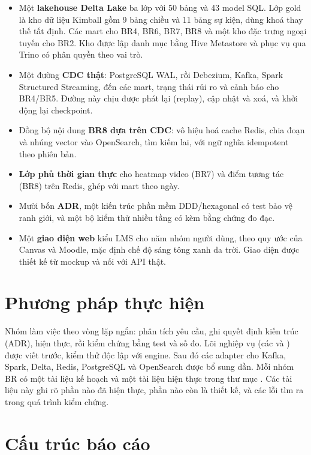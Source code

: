 \begin{itemize}
  \item Một \textbf{lakehouse Delta Lake} ba lớp với 50 bảng và 43 model SQL. Lớp gold là kho dữ liệu Kimball gồm 9 bảng chiều và 11 bảng sự kiện, dùng khoá thay thế tất định. Các mart cho BR4, BR6, BR7, BR8 và một kho đặc trưng ngoại tuyến cho BR2. Kho được lập danh mục bằng Hive Metastore và phục vụ qua Trino có phân quyền theo vai trò.
  \item Một đường \textbf{CDC thật}: PostgreSQL WAL, rồi Debezium, Kafka, Spark Structured Streaming, đến các mart, trạng thái rủi ro và cảnh báo cho BR4/BR5. Đường này chịu được phát lại (replay), cập nhật và xoá, và khởi động lại checkpoint.
  \item Đồng bộ nội dung \textbf{BR8 dựa trên CDC}: vô hiệu hoá cache Redis, chia đoạn và nhúng vector vào OpenSearch, tìm kiếm lai, với ngữ nghĩa idempotent theo phiên bản.
  \item \textbf{Lớp phủ thời gian thực} cho heatmap video (BR7) và điểm tương tác (BR8) trên Redis, ghép với mart theo ngày.
  \item Mười bốn \textbf{ADR}, một kiến trúc phần mềm DDD/hexagonal có test bảo vệ ranh giới, và một bộ kiểm thử nhiều tầng có kèm bằng chứng đo đạc.
  \item Một \textbf{giao diện web} kiểu LMS cho năm nhóm người dùng, theo quy ước của Canvas và Moodle, mặc định chế độ sáng tông xanh da trời. Giao diện được thiết kế từ mockup và nối với API thật.
\end{itemize}

\section{Phương pháp thực hiện}

Nhóm làm việc theo vòng lặp ngắn: phân tích yêu cầu, ghi quyết định kiến trúc (ADR), hiện thực, rồi kiểm chứng bằng test và số đo. Lõi nghiệp vụ (các  và ) được viết trước, kiểm thử độc lập với engine. Sau đó các adapter cho Kafka, Spark, Delta, Redis, PostgreSQL và OpenSearch được bổ sung dần. Mỗi nhóm BR có một tài liệu kế hoạch và một tài liệu hiện thực trong thư mục . Các tài liệu này ghi rõ phần nào đã hiện thực, phần nào còn là thiết kế, và các lỗi tìm ra trong quá trình kiểm chứng.

\section{Cấu trúc báo cáo}

